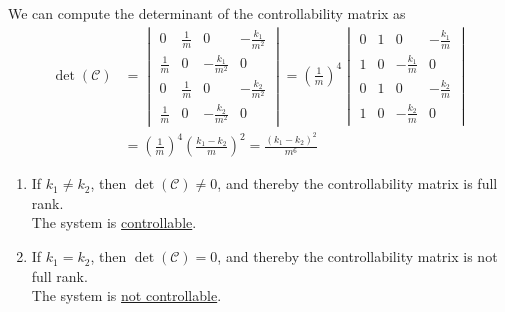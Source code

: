 We can compute the determinant of the controllability matrix as
\begin{align*}
    \det(\mathcal{C})
     & =
    \begin{vmatrix}
        0           & \frac{1}{m} & 0                  & -\frac{k_{1}}{m^2} \\
        \frac{1}{m} & 0           & -\frac{k_{1}}{m^2} & 0                  \\
        0           & \frac{1}{m} & 0                  & -\frac{k_{2}}{m^2} \\
        \frac{1}{m} & 0           & -\frac{k_{2}}{m^2} & 0
    \end{vmatrix}
    =
    {\left( \frac{1}{m} \right)}^{4}
    \begin{vmatrix}
        0 & 1 & 0                & -\frac{k_{1}}{m} \\
        1 & 0 & -\frac{k_{1}}{m} & 0                \\
        0 & 1 & 0                & -\frac{k_{2}}{m} \\
        1 & 0 & -\frac{k_{2}}{m} & 0
    \end{vmatrix}
    \\ & =
    {\left( \frac{1}{m} \right)}^{4}
    {\left( \frac{k_1 - k_2}{m} \right)}^{2}
    =
    \frac{{(k_1 - k_2)}^{2}}{m^6}
\end{align*}

\begin{enumerate}[label= (\roman*)]
    \item If \( k_{1} \neq k_{2} \), then \( \det(\mathcal{C}) \neq 0 \), and thereby the controllability matrix is full rank. \\
          The system is \underline{controllable}.

    \item If \( k_{1} = k_{2} \), then \( \det(\mathcal{C}) = 0 \), and thereby the controllability matrix is not full rank. \\
          The system is \underline{not controllable}.
\end{enumerate}
